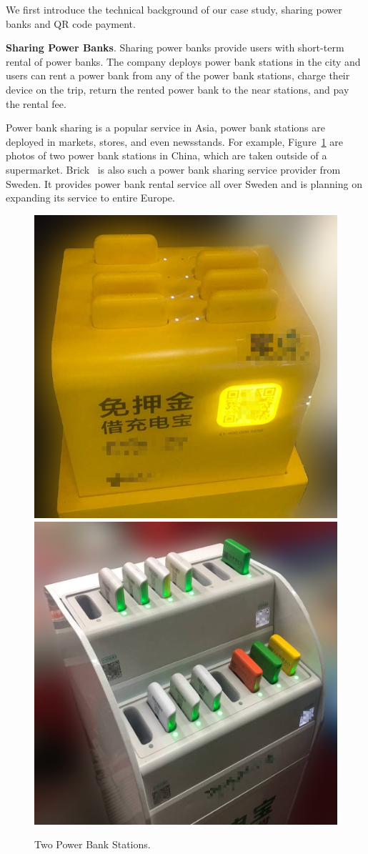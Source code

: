 \documentclass[conference]{IEEEtran}
\newcommand{\shuqing}[1]{}
\providecommand{\DIFdeltex}[1]{{\protect\color{red}\sout{#1}}}                      %
\providecommand{\DIFdelbegin}{} %
\providecommand{\DIFdelend}{} %
\providecommand{\DIFdel}[1]{\texorpdfstring{\DIFdeltex{#1}}{}} %
\newcommand{\DIFscaledelfig}{0.5}
\newlength{\DIFdelgraphicswidth} %
\newlength{\DIFdelgraphicsheight} %
\newcommand{\DIFdelincludegraphics}[2][]{%
\sbox{\DIFdelgraphicsbox}{\DIFOincludegraphics[#1]{#2}}%
\settoboxwidth{\DIFdelgraphicswidth}{\DIFdelgraphicsbox} %
\settoboxtotalheight{\DIFdelgraphicsheight}{\DIFdelgraphicsbox} %
\scalebox{\DIFscaledelfig}{%
\parbox[b]{\DIFdelgraphicswidth}{\usebox{\DIFdelgraphicsbox}\\[-\baselineskip] \rule{\DIFdelgraphicswidth}{0em}}\llap{\resizebox{\DIFdelgraphicswidth}{\DIFdelgraphicsheight}{%
\setlength{\unitlength}{\DIFdelgraphicswidth}%
\begin{picture}(1,1)%
\thicklines\linethickness{2pt} %
{\color[rgb]{1,0,0}\put(0,0){\framebox(1,1){}}}%
{\color[rgb]{1,0,0}\put(0,0){\line( 1,1){1}}}%
{\color[rgb]{1,0,0}\put(0,1){\line(1,-1){1}}}%
\end{picture}%
}\hspace*{3pt}}} %
} %
\DeclareRobustCommand{\DIFdelbegin}{\DIFOdelbegin \let\includegraphics\DIFdelincludegraphics} %
\DeclareRobustCommand{\DIFdelend}{\DIFOaddend \let\includegraphics\DIFOincludegraphics} %
\begin{document}
\DIFdelend We first introduce the technical background of our case study, sharing power
banks and QR code payment.

\textbf{Sharing Power Banks}.  Sharing power banks provide users with short-term
rental of power banks.  The company deploys power bank stations in the city and
users can rent a power bank from any of the power bank stations, charge their
device on the trip, return the rented power bank to the near stations, and pay
the rental fee.

Power bank sharing is a popular service in Asia, power bank stations are deployed
in markets, stores, and even newsstands. For example, Figure~\ref{fig:PBS_products} are photos
of two power bank stations in China, which are taken outside of a supermarket. Brick~\cite{Brick} is also such a power bank sharing service provider from
Sweden. It provides power bank rental service all over Sweden and is planning on expanding its
service to entire Europe.
\begin{figure}[t]
	\centering
	\includegraphics[width=.45 \linewidth, height=.45 \linewidth]{./Figs/PBS_mt.png}
	\includegraphics[width=.45 \linewidth, height=.45 \linewidth]{./Figs/PBS_xd.png}
	\caption{Two Power Bank Stations.}
	\label{fig:PBS_products}
\end{figure}

\DIFdelbegin \DIFdel{\shuqing{May use statistics (instead of concrete examples) to explain it.}
}\DIFdelend %
\end{document}
